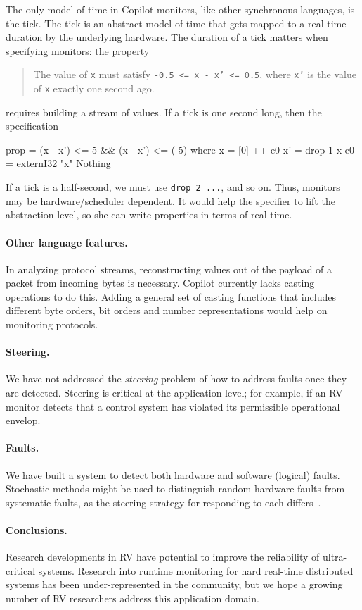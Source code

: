 The only model of time in Copilot monitors, like other synchronous languages, is
the tick.  The tick is an abstract model of time that gets mapped to a real-time
duration by the underlying hardware.  The duration of a tick matters when
specifying monitors: the property
%
\begin{quote}
The value of {\tt x} must satisfy {\tt -0.5
  <= x - x' <= 0.5}, where {\tt x'} is the value of {\tt x} exactly one second ago.
\end{quote}
%
\noindent
requires building a stream of values.  If a tick is one second long, then the
specification
%
\begin{code}
prop = (x - x') <= 5 && (x - x') <= (-5)
  where
  x  = [0] ++ e0 
  x' = drop 1 x
  e0 = externI32 "x" Nothing
\end{code}
%
\noindent
If a tick is a half-second, we must use {\tt drop 2 ...}, and so on.  Thus,
monitors may be hardware/scheduler dependent.  It would help the specifier to
lift the abstraction level, so she can write properties in terms of real-time.

\paragraph{Other language features.}
In analyzing protocol streams, reconstructing values out of the payload of
a packet from incoming bytes is necessary. Copilot currently lacks casting
operations to do this. Adding a general set of casting functions that includes
different byte orders, bit orders and number representations would help on
monitoring protocols.

\paragraph{Steering.}
We have not addressed the \emph{steering} problem of how to address faults once
they are detected.  Steering is critical at the application level; for example,
if an RV monitor detects that a control system has violated its permissible
operational envelop.

\paragraph{Faults.}
We have built a system to detect both hardware and software (logical) faults.
Stochastic methods might be used to distinguish random hardware faults from
systematic faults, as the steering strategy for responding to each
differs~\cite{SammapunLS05}.

\paragraph{Conclusions.}
Research developments in RV have potential to improve the reliability of
ultra-critical systems.  Research into runtime monitoring for hard real-time
distributed systems has been under-represented in the community, but we hope a
growing number of RV researchers address this application domain.
